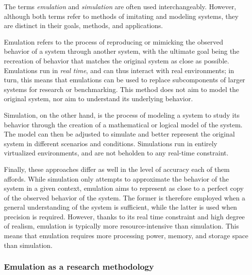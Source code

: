 The terms \emph{emulation} and \emph{simulation} are often used interchangeably.
However, although both terms refer to methods of imitating and modeling systems, they are distinct in their goals, methods, and applications.

Emulation refers to the process of reproducing or mimicking the observed behavior of a system through another system, 
with the ultimate goal being the recreation of behavior that matches the original system as close as possible.
Emulations run in \emph{real time}, and can thus interact with real environments;
in turn, this means that emulations can be used to replace subcomponents of larger systems for research or benchmarking.
This method does not aim to model the original system, nor aim to understand its underlying behavior.

Simulation, on the other hand, is the process of modeling a system to study its behavior through the creation of a mathematical or logical model of the system.
The model can then be adjusted to simulate and better represent the original system in different scenarios and conditions.
Simulations run in entirely virtualized environments, and are not beholden to any real-time constraint.

Finally, these approaches differ as well in the level of accuracy each of them affords.
While simulation only attempts to approximate the behavior of the system in a given context, emulation aims to represent as close to a perfect copy of the observed behavior of the system.
The former is therefore employed when a general understanding of the system is sufficient, while the latter is used when precision is required.
However, thanks to its real time constraint and high degree of realism, emulation is typically more resource-intensive than simulation.
This means that emulation requires more processing power, memory, and storage space than simulation.

\subsubsection{Emulation as a research methodology}

\subsection{}\label{background:xr}

